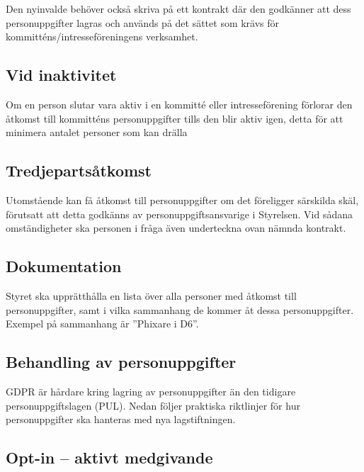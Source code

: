 Den nyinvalde behöver också skriva på ett kontrakt där den godkänner att dess personuppgifter lagras och används på det sättet som krävs för kommitténs/intresseföreningens verksamhet.

\subsection{Vid inaktivitet}

Om en person slutar vara aktiv i en kommitté eller intresseförening förlorar den åtkomst till kommitténs personuppgifter tills den blir aktiv igen, detta för att minimera antalet personer som kan drälla 

\subsection{Tredjepartsåtkomst}

Utomstående kan få åtkomst till personuppgifter om det föreligger särskilda skäl, förutsatt att detta godkänns av personuppgiftsansvarige i Styrelsen. Vid sådana omständigheter ska personen i fråga även underteckna ovan nämnda kontrakt. 

\subsection{Dokumentation}
    
Styret ska upprätthålla en lista över alla personer med åtkomst till personuppgifter, samt i vilka sammanhang de kommer åt dessa personuppgifter. Exempel på sammanhang är ''Phixare i D6''.

\subsection{Behandling av personuppgifter}

GDPR är hårdare kring lagring av personuppgifter än den tidigare personuppgiftslagen (PUL). Nedan följer praktiska riktlinjer för hur personuppgifter ska hanteras med nya lagstiftningen.

\subsection{Opt-in -- aktivt medgivande}
\label{ss:optin}

